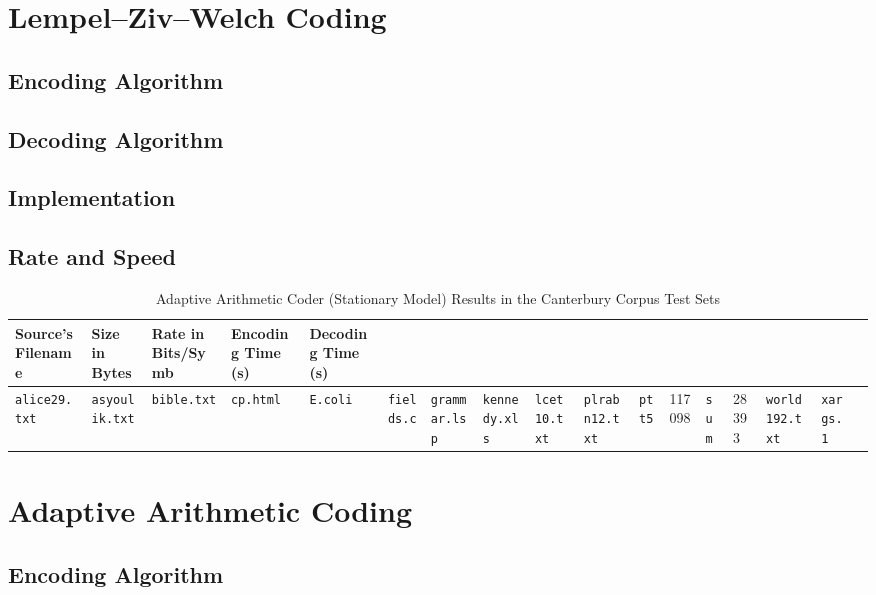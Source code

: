 \documentclass[a4paper, twocolumn]{article}
\begin{document}
    \clearpage
    \section{Lempel--Ziv--Welch Coding} \label{sec:lempel_ziv_welch}
        \subsection{Encoding Algorithm} \label{sec:lzw_encoding_algorithm}
        \subsection{Decoding Algorithm} \label{sec:lzw_decoding_algorithm}
        \subsection{Implementation} \label{sec:lzw_implementation}
        \subsection{Rate and Speed} \label{sec:lzw_rate_and_speed}

    \begin{table*}[t]
        \centering
        \begin{tabular}{lllll}
        \toprule
            Source's Filename & Size in Bytes & Rate in Bits/Symb & Encoding Time (s) & Decoding Time (s) \\
        \midrule
            \texttt{alice29.txt} &
            \texttt{asyoulik.txt} &
            \texttt{bible.txt} &
            \texttt{cp.html} &
            \texttt{E.coli} &
            \texttt{fields.c} &
            \texttt{grammar.lsp} &
            \texttt{kennedy.xls} &
            \texttt{lcet10.txt} &
            \texttt{plrabn12.txt} &
            \texttt{ptt5} & 117098 &
            \texttt{sum} & 28393 &
            \texttt{world192.txt} &
            \texttt{xargs.1} &
        \bottomrule
        \end{tabular}
        \caption{Adaptive Arithmetic Coder (Stationary Model) Results in the Canterbury Corpus Test Sets}
        \label{tab:aac}
    \end{table*}

    \clearpage
    \section{Adaptive Arithmetic Coding} \label{sec:adaptive_arithmetic_coding}
        \subsection{Encoding Algorithm} \label{sec:aac_encoding_algorithm}
\end{document}
